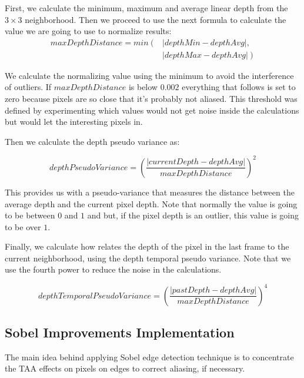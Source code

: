 \documentclass{cslthse-msc}
\begin{document}
First, we calculate the minimum, maximum and average linear depth from the $3\times 3$ neighborhood. Then we proceed to use the next formula to calculate the value we are going to use to normalize results:
\begin{equation} \label{eq:maxdepthdistance}
\begin{split} 
	maxDepthDistance = min \left( \right. & \left| depthMin-depthAvg \right|  ,   \\ 
	 &  \left.\left| depthMax-depthAvg\right| \right) 
\end{split} 
\end{equation}

We calculate the normalizing value using the minimum to avoid the interference of outliers. If $maxDepthDistance$  is below $0.002$ everything that follows is set to zero because pixels are so close that it’s probably not aliased. This threshold was defined by experimenting which values would not get noise inside the calculations but would let the interesting pixels in. 

Then we calculate the depth pseudo variance as:

\begin{equation} \label{eq:depthpseudovariance}
	depthPseudoVariance = \left( \frac{\left|currentDepth-depthAvg\right|}{maxDepthDistance}\right)^2
\end{equation}

This provides us with a pseudo-variance that measures the distance between the average depth and the current pixel depth. Note that normally the value is going to be between $0$ and $1$ and but, if the pixel depth is an outlier, this value is going to be over $1$.

Finally, we calculate how relates the depth of the pixel in the last frame to the current neighborhood, using the depth temporal pseudo variance. Note that we use the fourth power to reduce the noise in the calculations.

\begin{equation} \label{eq:depthtemporalpseudovariance}
depthTemporalPseudoVariance = \left( \frac{\left|pastDepth-depthAvg\right|}{maxDepthDistance}\right)^4
\end{equation}

\subsection{Sobel Improvements Implementation}
The main idea behind applying Sobel edge detection technique is to concentrate the TAA effects on pixels on edges to correct aliasing, if necessary.  
\end{document}
